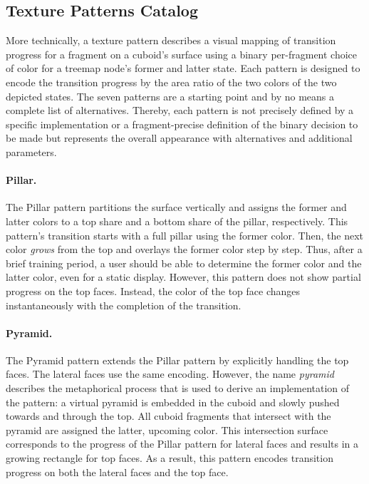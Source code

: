\documentclass[smallextended,natbib]{svjour3}       %
\begin{document}
\subsection{Texture Patterns Catalog}
More technically, a texture pattern describes a visual mapping of transition progress for a fragment on a cuboid's surface using a binary per-fragment choice of color for a treemap node's former and latter state.
Each pattern is designed to encode the transition progress by the area ratio of the two colors of the two depicted states.
The seven patterns are a starting point and by no means a complete list of alternatives.
Thereby, each pattern is not precisely defined by a specific implementation or a fragment-precise definition of the binary decision to be made but represents the overall appearance with alternatives and additional parameters.

\paragraph{Pillar.}
The Pillar pattern partitions the surface vertically and assigns the former and latter colors to a top share and a bottom share of the pillar, respectively.
This pattern's transition starts with a full pillar using the former color.
Then, the next color \emph{grows} from the top and overlays the former color step by step.
Thus, after a brief training period, a user should be able to determine the former color and the latter color, even for a static display.
However, this pattern does not show partial progress on the top faces.
Instead, the color of the top face changes instantaneously with the completion of the transition.

\paragraph{Pyramid.}
The Pyramid pattern extends the Pillar pattern by explicitly handling the top faces.
The lateral faces use the same encoding.
However, the name \emph{pyramid} describes the metaphorical process that is used to derive an implementation of the pattern: 
a virtual pyramid is embedded in the cuboid and slowly pushed towards and through the top. 
All cuboid fragments that intersect with the pyramid are assigned the latter, upcoming color.
This intersection surface corresponds to the progress of the Pillar pattern for lateral faces and results in a growing rectangle for top faces.
As a result, this pattern encodes transition progress on both the lateral faces and the top face.
\end{document}
